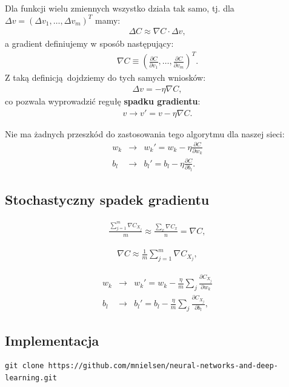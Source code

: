 \documentclass[10pt, oneside]{article}
\theoremstyle{remark}
\begin{document}
Dla funkcji wielu zmiennych wszystko działa tak samo, tj. dla $\Delta v = (\Delta v_1, \ldots, \Delta v_m)^T$ mamy:
\begin{eqnarray} 
  \Delta C \approx \nabla C \cdot \Delta v,
\end{eqnarray}
a gradient definiujemy w sposób następujący:
\begin{eqnarray}
  \nabla C \equiv \left(\frac{\partial C}{\partial v_1}, \ldots, 
  \frac{\partial C}{\partial v_m}\right)^T.
\end{eqnarray}
Z taką definicją dojdziemy do tych samych wniosków:
\begin{eqnarray}
  \Delta v = -\eta \nabla C,
\end{eqnarray}
co pozwala wyprowadzić regułę \textbf{spadku gradientu}:
\begin{eqnarray}
  v \rightarrow v' = v-\eta \nabla C.
\end{eqnarray}

Nie ma żadnych przeszkód do zastosowania tego algorytmu dla naszej sieci:
\begin{eqnarray}
  w_k & \rightarrow & w_k' = w_k-\eta \frac{\partial C}{\partial w_k} \\
  b_l & \rightarrow & b_l' = b_l-\eta \frac{\partial C}{\partial b_l}.
\end{eqnarray}


\subsection{Stochastyczny spadek gradientu}

\begin{eqnarray}
  \frac{\sum_{j=1}^m \nabla C_{X_{j}}}{m} \approx \frac{\sum_x \nabla C_x}{n} = \nabla C,
\end{eqnarray}

\begin{eqnarray}
  \nabla C \approx \frac{1}{m} \sum_{j=1}^m \nabla C_{X_{j}},
\end{eqnarray}

\begin{eqnarray} 
  w_k & \rightarrow & w_k' = w_k-\frac{\eta}{m}
  \sum_j \frac{\partial C_{X_j}}{\partial w_k} \\
  b_l & \rightarrow & b_l' = b_l-\frac{\eta}{m}
  \sum_j \frac{\partial C_{X_j}}{\partial b_l},
\end{eqnarray}

\subsection{Implementacja}

\begin{verbatim}
git clone https://github.com/mnielsen/neural-networks-and-deep-learning.git
\end{verbatim}
\end{document}
